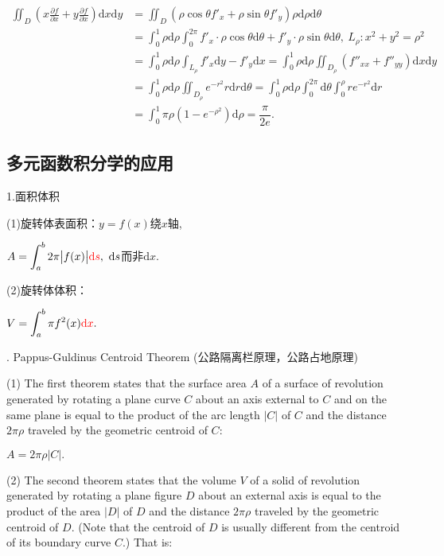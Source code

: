 \documentclass[UTF8]{ctexart}
\numberwithin{equation}{section}
\numberwithin{figure}{section}
\numberwithin{table}{section}
\newcommand\dif{\mathrm{d}}
\newcommand\no{\noindent}
\newcommand\dis{\displaystyle}
\newcommand\pfx{\dis\frac{\partial f}{\partial x}}
\newcommand\pfy{\dis\frac{\partial f}{\partial x}}
\newcommand\intab{\dis\int_a^b}
\begin{document}
\begin{spacing}{2}
\begin{spacing}{2.5}

$\begin{aligned}
\dis\iint_D\left(x\pfx+y\pfy\right)\dif x\dif y
&=\iint_D\left(\rho\cos\theta f'_x+\rho\sin\theta f'_y\right)\rho\dif\rho\dif\theta\\
&=\int_0^1\rho\dif\rho\int_0^{2\pi}f'_x\cdot\rho\cos\theta\dif\theta
+f'_y\cdot\rho\sin\theta\dif\theta,\ L_\rho: x^2+y^2=\rho^2\\
&=\int_0^1\rho\dif\rho\int_{L_\rho}f'_x\dif y-f'_y\dif x
=\int_0^1\rho\dif\rho\iint_{D_\rho}\left(f''_{xx}+f''_{yy}\right)\dif x\dif y\\
&=\int_0^1\rho\dif\rho\iint_{D_\rho}e^{-r^2}r\dif r\dif\theta
=\int_0^1\rho\dif\rho\int_0^{2\pi}\dif\theta\int_0^\rho re^{-r^2}\dif r\\
&=\int_0^1\pi\rho\left(1-e^{-\rho^2}\right)\dif\rho
=\dfrac{\pi}{2e}.
\end{aligned}$
\end{spacing}

\vspace{1.5cm}

\subsection{多元函数积分学的应用}

\no1.面积体积

(1)旋转体表面积：$y=f(x)$绕$x$轴,

\centerline{$A=\intab 2\pi\big|f(x)\big|\textcolor[rgb]{1,0,0}{\dif s},\ \dif s$而非$\dif x.$}

(2)旋转体体积：

\centerline{$V=\intab\pi f^2(x)\textcolor[rgb]{1,0,0}{\dif x}.$}

\no2. Pappus-Guldinus Centroid Theorem (公路隔离栏原理，公路占地原理)

(1) \textcolor[rgb]{1,0,0}{The first theorem} states that the surface area $A$ of a surface of revolution generated by rotating a plane curve $C$ about an axis external to $C$ and on the same plane is equal to the product of the arc length $\big|C\big|$ of $C$ and the distance $2\pi\rho$ traveled by the geometric centroid of $C$:

\centerline{$A=2\pi\rho\big|C\big|.$}

(2) \textcolor[rgb]{1,0,0}{The second theorem} states that the volume $V$ of a solid of revolution generated by rotating a plane figure $D$ about an external axis is equal to the product of the area $\big|D\big|$ of $D$ and the distance $2\pi\rho$ traveled by the geometric centroid of $D$. (Note that the centroid of $D$ is usually different from the centroid of its boundary curve $C$.) That is:


\end{spacing}
\end{document}

